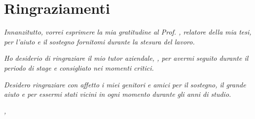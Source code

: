 
\cleardoublepage
{}
{}



\bigskip

\begingroup
\let\clearpage\relax
\let\cleardoublepage\relax
\let\cleardoublepage\relax

\chapter*{Ringraziamenti}

\noindent \textit{Innanzitutto, vorrei esprimere la mia gratitudine al Prof. \myProf, relatore della mia tesi, per l'aiuto e il sostegno fornitomi durante la stesura del lavoro.}
\bigskip

\noindent \textit{Ho desiderio di ringraziare il mio tutor aziendale, \fabio, per avermi seguito durante il periodo di stage e consigliato nei momenti critici.} %
\bigskip

\noindent \textit{Desidero ringraziare con affetto i miei genitori e amici per il sostegno, il grande aiuto e per essermi stati vicini in ogni momento durante gli anni di studio.}
\bigskip


\noindent\textit{\myLocation, \myTime}
\hfill \myName

\endgroup
